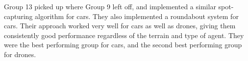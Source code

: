 \documentclass[a4paper,12pt]{article}
\begin{document}



Group 13 picked up where Group 9 left off, and implemented a similar spot-capturing algorithm for cars. They also implemented a roundabout system for cars. Their approach worked very well for cars as well as drones, giving them consistently good performance regardless of the terrain and type of agent. They were the best performing group for cars, and the second best performing group for drones.
\end{document}
